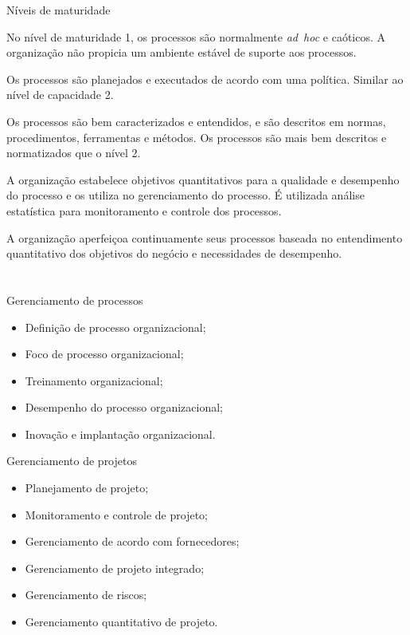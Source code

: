 \begin{frame}{Níveis de maturidade}\footnotesize
\begin{description}[<+->]
\item[1. Inicial:] No nível de maturidade 1, os processos são
  normalmente {\em ad~hoc} e caóticos. A organização não propicia um
  ambiente estável de suporte aos processos.
\item[2. Gerenciado:] Os processos são planejados e executados de
  acordo com uma política. Similar ao nível de capacidade 2.
\item[3. Definido:] Os processos são bem caracterizados e entendidos,
  e são descritos em normas, procedimentos, ferramentas e métodos. Os
  processos são mais bem descritos e normatizados que o nível 2.
\item[4. Gerenciado Quantitativamente:] A organização estabelece
  objetivos quantitativos para a qualidade e desempenho do processo e
  os utiliza no gerenciamento do processo. É utilizada análise
  estatística para monitoramento e controle dos processos.
\item[5. Em Otimização:] A organização aperfeiçoa continuamente seus
  processos baseada no entendimento quantitativo dos objetivos do
  negócio e necessidades de desempenho.
\end{description}
\end{frame}

\section{\insertlecture}

\begin{frame}{Gerenciamento de processos}
  \begin{itemize}[<+->]
  \item Definição de processo organizacional;
  \item Foco de processo organizacional;
  \item Treinamento organizacional;
  \item Desempenho do processo organizacional;
  \item Inovação e implantação organizacional.
  \end{itemize}
\end{frame}

\begin{frame}{Gerenciamento de projetos}
  \begin{itemize}[<+->]
  \item Planejamento de projeto;
  \item Monitoramento e controle de projeto;
  \item Gerenciamento de acordo com fornecedores;
  \item Gerenciamento de projeto integrado;
  \item Gerenciamento de riscos;
  \item Gerenciamento quantitativo de projeto.
  \end{itemize}
\end{frame}

